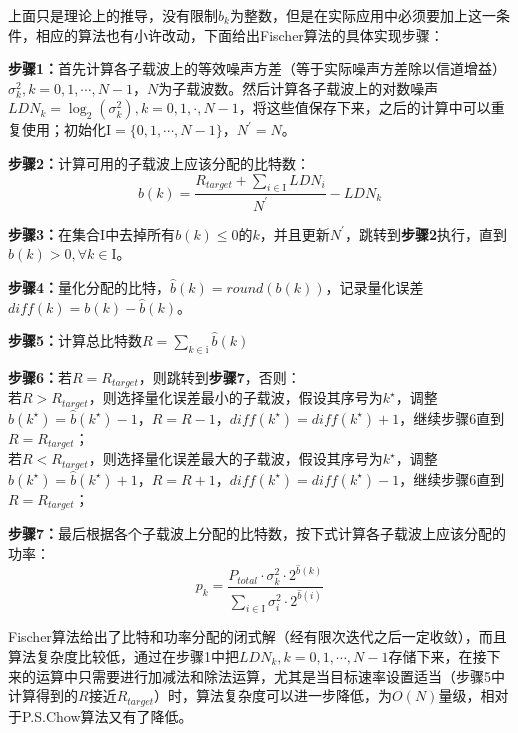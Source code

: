 上面只是理论上的推导，没有限制$b_k$为整数，但是在实际应用中必须要加上这一条件，相应的算法也有小许改动，下面给出Fischer算法的具体实现步骤：
\begin{description}
\item{\bf{步骤1：}}首先计算各子载波上的等效噪声方差（等于实际噪声方差除以信道增益）$\sigma_k^2,k=0,1,\cdots,N-1$，$N$为子载波数。然后计算各子载波上的对数噪声$LDN_k=\log_2(\sigma_k^2),k=0,1,\cdot,N-1$，将这些值保存下来，之后的计算中可以重复使用；初始化$\mathrm{I}=\{0,1,\cdots,N-1\}$，$N^\prime=N$。
\item{\bf{步骤2：}}计算可用的子载波上应该分配的比特数：
\begin{equation}
b(k) = \frac{R_{target}+\sum_{i\in \mathrm{I}}LDN_i}{N^\prime}-LDN_k
\end{equation}
\item{\bf{步骤3：}}在集合$\mathrm{I}$中去掉所有$b(k)\leq 0$的$k$，并且更新$N^\prime$，跳转到\textbf{步骤2}执行，直到$b(k)>0, \forall k\in \mathrm{I}$。
\item{\bf{步骤4：}}量化分配的比特，$\hat{b}(k)=round(b(k))$，记录量化误差$diff(k)=b(k)-\hat{b}(k)$。
\item{\bf{步骤5：}}计算总比特数$R=\sum_{k\in \mathrm{i}}\hat{b}(k)$
\item{\bf{步骤6：}}若$R=R_{target}$，则跳转到\textbf{步骤7}，否则：\\
若$R>R_{target}$，则选择量化误差最小的子载波，假设其序号为$k^\star$，调整$\hat{b}(k^\star)=\hat{b}(k^\star)-1$，$R=R-1$，$diff(k^\star)=diff(k^\star)+1$，继续步骤6直到$R=R_{target}$；\\
若$R<R_{target}$，则选择量化误差最大的子载波，假设其序号为$k^\star$，调整$\hat{b}(k^\star)=\hat{b}(k^\star)+1$，$R=R+1$，$diff(k^\star)=diff(k^\star)-1$，继续步骤6直到$R=R_{target}$；
\item{\bf{步骤7：}}最后根据各个子载波上分配的比特数，按下式计算各子载波上应该分配的功率：
\begin{equation}
p_k = \frac{P_{total}\cdot \sigma_k^2\cdot 2^{\hat{b}(k)}}{\sum_{i\in \mathrm{I}}\sigma_i^2\cdot 2^{\hat{b}(i)}}
\end{equation}
\end{description}

Fischer算法给出了比特和功率分配的闭式解（经有限次迭代之后一定收敛），而且算法复杂度比较低，通过在步骤1中把$LDN_k, k=0,1,\cdots,N-1$存储下来，在接下来的运算中只需要进行加减法和除法运算，尤其是当目标速率设置适当（步骤5中计算得到的$R$接近$R_{target}$）时，算法复杂度可以进一步降低，为$O(N)$量级，相对于P.S.Chow算法又有了降低。

